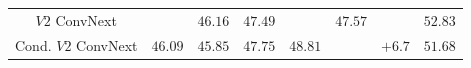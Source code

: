 \begin{table}[!htbp]
{\begin{tabular}{c|ccccccc}
			$V2$ ConvNext        &                                                                             & \textit{$46.16$}          & \textit{$47.49$}          & \textit{\pmb{$47.69$}} & \textit{$47.57$}          & {\color[HTML]{009901} }                                                   & $52.83$                                                                          \\
			Cond. $V2$ ConvNext  & \multirow{-2}{*}{$46.09$}                                                     & \textit{$45.85$}          & \textit{$47.75$}          & \textit{$48.81$}          & \textit{\pmb{$49.19$}} & \multirow{-2}{*}{{\color[HTML]{009901} $+6.7$}}                             & $51.68$                                                                          \\ \hline
		\end{tabular}%
	}
\end{table}


